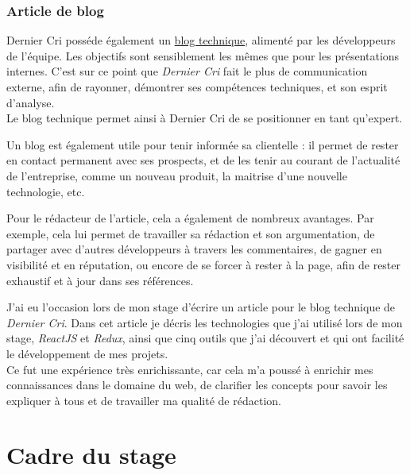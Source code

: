 \bigskip

\subsubsection{Article de blog}\label{article-de-blog}

\bigskip

Dernier Cri posséde également un
\href{http://derniercri.io/tech-blog}{blog technique}, alimenté par les
développeurs de l'équipe. Les objectifs sont sensiblement les mêmes que
pour les présentations internes. C'est sur ce point que \emph{Dernier
Cri} fait le plus de communication externe, afin de rayonner, démontrer
ses compétences techniques, et son esprit d'analyse.\\
Le blog technique permet ainsi à Dernier Cri de se positionner en tant
qu'expert.

\bigskip

Un blog est également utile pour tenir informée sa clientelle : il
permet de rester en contact permanent avec ses prospects, et de les
tenir au courant de l'actualité de l'entreprise, comme un nouveau
produit, la maitrise d'une nouvelle technologie, etc.

\bigskip

Pour le rédacteur de l'article, cela a également de nombreux avantages.
Par exemple, cela lui permet de travailler sa rédaction et son
argumentation, de partager avec d'autres développeurs à travers les
commentaires, de gagner en visibilité et en réputation, ou encore de se
forcer à rester à la page, afin de rester exhaustif et à jour dans ses
références.

\bigskip

J'ai eu l'occasion lors de mon stage d'écrire un article pour le blog
technique de \emph{Dernier Cri}. Dans cet article je décris les
technologies que j'ai utilisé lors de mon stage, \emph{ReactJS} et
\emph{Redux}, ainsi que cinq outils que j'ai découvert et qui ont
facilité le développement de mes projets.\\
Ce fut une expérience très enrichissante, car cela m'a poussé à enrichir
mes connaissances dans le domaine du web, de clarifier les concepts pour
savoir les expliquer à tous et de travailler ma qualité de rédaction.

\newpage

\section{Cadre du stage}\label{cadre-du-stage}

